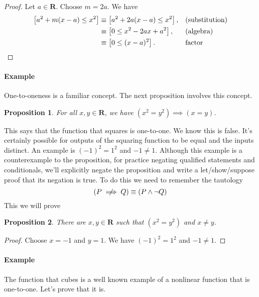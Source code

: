 \documentclass[12pt,fleqn]{article}
\newcommand{\reals}{\mathbf{R}}
\newcommand{\notimplies}{\centernot\implies}
\newenvironment{myproof}
  {\begin{shaded}\begin{proof}}
  {\end{proof}\end{shaded}}
\newtheorem{prop}{Proposition}
\newcounter{ex}\setcounter{ex}{0}
\newcommand{\ex}{%
\setcounter{ex}{\value{ex}+1}
\paragraph{Example \theex}}
\begin{document}
      \begin{myproof} 
      Let $a \in \reals$. Choose $m=2a$. We have
      \begin{align*}
       \left[{a^2+m(x-a) \le x^2} \right]   
       &\equiv \left[a^2+2a(x-a)\le x^2\right], &&\text{(substitution)}\\
      &\equiv \left[0 \le x^2-2ax+a^2\right], &&\text{(algebra)}\\
      &\equiv \left[0 \le (x-a)^2\right]. &&\text{factor}  \qedhere
      \end{align*}
  \end{myproof}

  \ex One-to-oneness is a familiar concept. The next proposition 
  involves this concept.

     \begin{prop} For all $x,y \in \reals$, we have $(x^2 = y^2) \implies (x=y)$. 
     \end{prop} 
    \noindent This says that the function that squares is one-to-one. We know this is false. It's certainly possible for outputs of 
    the squaring function to be equal and the inputs distinct. An example is $(-1)^2 = 1^2$ and $-1 \neq 1$. Although this example
    is a counterexample to the proposition, for  practice negating qualified statements and conditionals,  we'll explicitly negate the proposition and write a let/show/suppose  proof that its negation is true.
    To do this we need to remember the tautology
    \begin{equation*}
       \left(P \notimplies Q\right) \equiv \left(P \land \lnot Q\right)
 \end{equation*}
   This we will prove
    \begin{prop} There are $x,y \in \reals$ such that  $(x^2 = y^2)$ and $x\neq y$. 
     \end{prop} 
     
     \begin{myproof} Choose $x=-1$ and $y=1$. We have $(-1)^2 = 1^2$ and $-1 \neq 1$.      \end{myproof}

     \ex The function that cubes is a well known example of a nonlinear 
     function that is one-to-one. Let's prove that it is.
\end{document}
